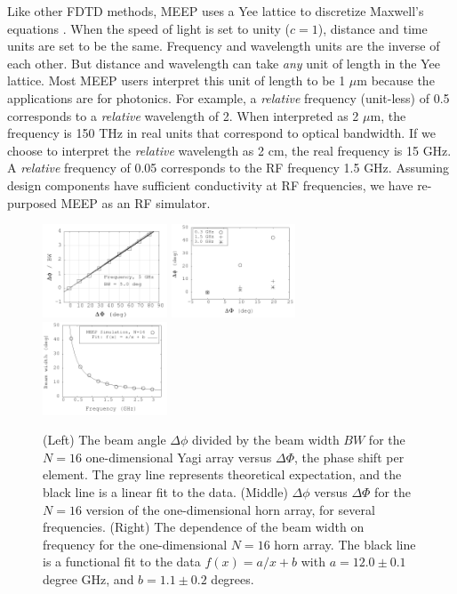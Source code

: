 \documentclass[../../main.tex]{subfiles}
\begin{document}
Like other FDTD methods, MEEP uses a Yee lattice to discretize Maxwell's equations \cite{10.1109/tap.1966.1138693}.  When the speed of light is set to unity ($c = 1$), distance and time units are set to be the same.  Frequency and wavelength units are the inverse of each other.  But distance and wavelength can take \textit{any} unit of length in the Yee lattice.  Most MEEP users interpret this unit of length to be 1 $\mu$m because the applications are for photonics.  For example, a \textit{relative} frequency (unit-less) of 0.5 corresponds to a \textit{relative} wavelength of 2.  When interpreted as 2 $\mu$m, the frequency is 150 THz in real units that correspond to optical bandwidth.  If we choose to interpret the \textit{relative} wavelength as 2 cm, the real frequency is 15 GHz.  A \textit{relative} frequency of 0.05 corresponds to the RF frequency 1.5 GHz.  Assuming design components have sufficient conductivity at RF frequencies, we have re-purposed MEEP as an RF simulator.  \\ \vspace{2.5mm}

\begin{figure}
\centering
\includegraphics[width=0.33\textwidth]{figures/Oct30_plot1.png}
\includegraphics[width=0.33\textwidth]{figures/Aug11_plot2.png}
\includegraphics[width=0.33\textwidth]{figures/Aug11_plot1.png}
\caption{\label{fig:pa_1} (Left) The beam angle $\Delta \phi$ divided by the beam width $BW$ for the $N = 16$ one-dimensional Yagi array versus $\Delta \Phi$, the phase shift per element. The gray line represents theoretical expectation, and the black line is a linear fit to the data.  (Middle) $\Delta \phi$ versus $\Delta \Phi$ for the $N=16$ version of the one-dimensional horn array, for several frequencies.  (Right) The dependence of the beam width on frequency for the one-dimensional $N=16$ horn array.  The black line is a functional fit to the data $f(x) = a/x + b$ with $a=12.0\pm 0.1$ degree GHz, and $b=1.1\pm 0.2$ degrees.}
\end{figure}
\end{document}
